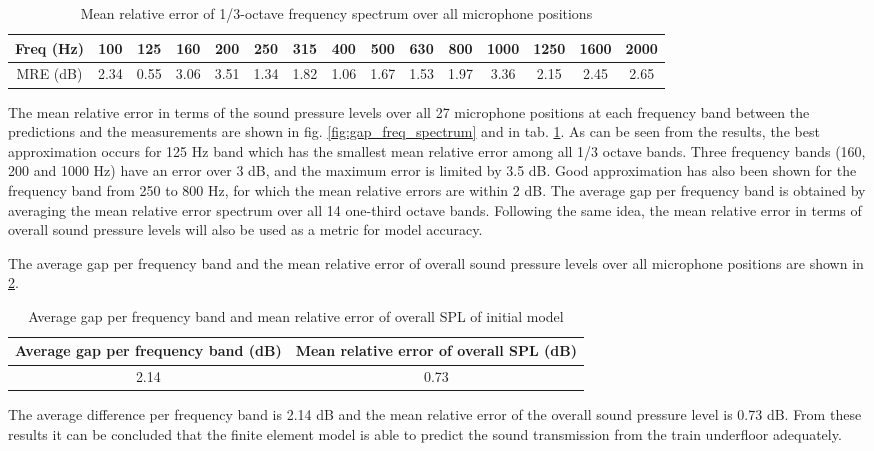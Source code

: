 \begin{table}[H]
	\caption{Mean relative error of 1/3-octave frequency spectrum over all microphone positions}
	\begin{tabular}{c|cccccccccccccc}
		Freq (Hz)           & 100  & 125  & 160  & 200  & 250  & 315  & 400  & 500  & 630  & 800  & 1000 & 1250 & 1600 & 2000 \\ \hline
		MRE (dB) & 2.34 & 0.55 & 3.06 & 3.51 & 1.34 & 1.82 & 1.06 & 1.67 & 1.53 & 1.97 & 3.36 & 2.15 & 2.45 & 2.65
	\end{tabular}
	\label{tab:MRE_spectra}
\end{table}

\noindent The mean relative error in terms of the sound pressure levels over all 27 microphone positions at each frequency band between the predictions and the measurements are shown in fig. \ref{fig:gap_freq_spectrum} and in tab. \ref{tab:MRE_spectra}. As can be seen from the results, the best approximation occurs for 125 Hz band which has the smallest mean relative error among all 1/3 octave bands. Three frequency bands (160, 200 and 1000 Hz) have an error over 3 dB, and the maximum error is limited by 3.5 dB. Good approximation has also been shown for the frequency band from 250 to 800 Hz, for which the mean relative errors are within 2 dB. The average gap per frequency band is obtained by averaging the mean relative error spectrum over all 14 one-third octave bands. Following the same idea, the mean relative error in terms of overall sound pressure levels will also be used as a metric for model accuracy.

The average gap per frequency band and the mean relative error of overall sound pressure levels over all microphone positions are shown in \cref{tab:average_gap}.
\begin{table}[H]
	\centering
	\caption{Average gap per frequency band and mean relative error of overall SPL of initial model}
	\begin{tabular}{c|c}
		Average gap per  frequency band (dB) & Mean relative error of overall SPL (dB) \\ \hline
		2.14 & 0.73
	\end{tabular}
	\label{tab:average_gap}
\end{table}
\noindent The average difference per frequency band is 2.14 dB and the mean relative error of the overall sound pressure level is 0.73 dB. From these results it can be concluded that the finite element model is able to predict the sound transmission from the train underfloor adequately.


